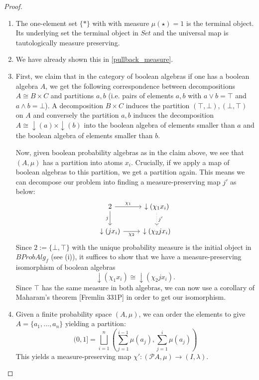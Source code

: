 \documentclass[a4paper,draft]{amsproc}
\theoremstyle{plain}
\theoremstyle{definition}
\theoremstyle{remark}
\numberwithin{equation}{section}
\begin{document}
\begin{proof} 
\begin{enumerate}
\item The one-element set $\{*\}$ with with measure $\mu(\star)=1$ is the terminal object. Its underlying set the terminal object in $Set$ and the universal map is tautologically measure preserving.
\item We have already shown this in \ref{pullback_measure}.
\item First, we claim that in the category of boolean algebras if one has a boolean algebra $A$, we get the following correspondence between decompositions $A \cong B \times C$ and partitions $a,b$ (i.e. pairs of elements $a,b$ with $a \vee b = \top$ and $a \wedge b = \bot$). A decomposition $B \times C$ induces the partition $(\top,\bot), (\bot,\top)$ on $A$ and conversely the partition $a,b$ induces the decomposition $A \cong \downarrow(a) \times \downarrow(b)$ into the boolean algebra of elements smaller than $a$ and the boolean algebra of elements smaller than $b$.

Now, given boolean probability algebras as in the claim above, we see that $(A, \mu)$ has a partition into atoms $x_i$. Crucially, if we apply a map of boolean algebras to this partition, we get a partition again. This means we can decompose our problem into finding a measure-preserving map $j'$ as below:
\[
\begin{tikzcd}
2 \arrow[d, "j"'] \arrow[r, "\chi_1"]  & \downarrow(\chi_1 x_i) \arrow[d, "j'", dotted] \\
\downarrow(j x_i) \arrow[r, "\chi_2"'] & \downarrow(\chi_2 j x_i)                      
\end{tikzcd}
\]
Since $2 := \{\bot, \top\}$ with the unique probability measure is the initial object in $BProbAlg_f$ (see (i)), it suffices to show that we have a measure-preserving isomorphism of boolean algebras
\[
\downarrow(\chi_1 x_i) \cong \downarrow(\chi_2 j x_i).
\]
Since $\top$ has the same measure in both algebras, we can now use a corollary of Maharam's theorem [Fremlin 331P] in order to get our isomorphism.

\item Given a finite probability space $(A,\mu)$, we can order the elements to give $A=\{a_1,...,a_n\}$ yielding a partition:
\[ (0,1]=\bigsqcup_{i=1}^n (\sum_{j=1}^{i-1} \mu(a_j), \sum_{j=1}^{i} \mu(a_j))\]
This yields a measure-preserving map $\chi':(\mathcal{P} A,\mu)\rightarrow (I,\lambda)$.



\end{enumerate}
\end{proof}
\end{document}
